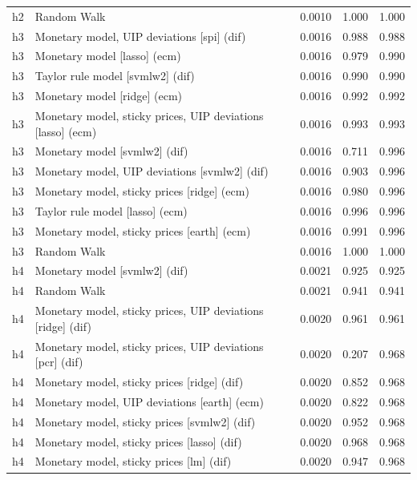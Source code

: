 \begin{ThreePartTable}
\begin{longtable}[t]{cp{5.5cm}ccc}
h2 & \raggedright Random Walk & 0.0010 & 1.000 & 1.000\\
\addlinespace
h3 & \raggedright Monetary model, UIP deviations [spi] (dif) & 0.0016 & 0.988 & 0.988\\
h3 & \raggedright Monetary model [lasso] (ecm) & 0.0016 & 0.979 & 0.990\\
h3 & \raggedright Taylor rule model [svmlw2] (dif) & 0.0016 & 0.990 & 0.990\\
h3 & \raggedright Monetary model [ridge] (ecm) & 0.0016 & 0.992 & 0.992\\
h3 & \raggedright Monetary model, sticky prices, UIP deviations [lasso] (ecm) & 0.0016 & 0.993 & 0.993\\
h3 & \raggedright Monetary model [svmlw2] (dif) & 0.0016 & 0.711 & 0.996\\
h3 & \raggedright Monetary model, UIP deviations [svmlw2] (dif) & 0.0016 & 0.903 & 0.996\\
h3 & \raggedright Monetary model, sticky prices [ridge] (ecm) & 0.0016 & 0.980 & 0.996\\
h3 & \raggedright Taylor rule model [lasso] (ecm) & 0.0016 & 0.996 & 0.996\\
h3 & \raggedright Monetary model, sticky prices [earth] (ecm) & 0.0016 & 0.991 & 0.996\\
h3 & \raggedright Random Walk & 0.0016 & 1.000 & 1.000\\
\addlinespace
h4 & \raggedright Monetary model [svmlw2] (dif) & 0.0021 & 0.925 & 0.925\\
h4 & \raggedright Random Walk & 0.0021 & 0.941 & 0.941\\
h4 & \raggedright Monetary model, sticky prices, UIP deviations [ridge] (dif) & 0.0020 & 0.961 & 0.961\\
h4 & \raggedright Monetary model, sticky prices, UIP deviations [pcr] (dif) & 0.0020 & 0.207 & 0.968\\
h4 & \raggedright Monetary model, sticky prices [ridge] (dif) & 0.0020 & 0.852 & 0.968\\
h4 & \raggedright Monetary model, UIP deviations [earth] (ecm) & 0.0020 & 0.822 & 0.968\\
h4 & \raggedright Monetary model, sticky prices [svmlw2] (dif) & 0.0020 & 0.952 & 0.968\\
h4 & \raggedright Monetary model, sticky prices [lasso] (dif) & 0.0020 & 0.968 & 0.968\\
h4 & \raggedright Monetary model, sticky prices [lm] (dif) & 0.0020 & 0.947 & 0.968\\

\end{longtable}
\end{ThreePartTable}
